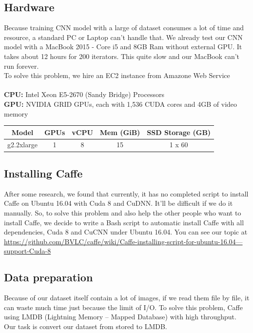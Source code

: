 \subsection{Hardware}
Because training CNN model with a large of dataset consumes a lot of time and resource, a standard PC or Laptop can't handle that. We already test our CNN model with a MacBook 2015 - Core i5 and 8GB Ram without external GPU. It takes about 12 hours for 200 iterators. This quite slow and our MacBook can't run forever.\\
To solve this problem, we hire an EC2 instance from Amazone Web Service\\
\\
\textbf{CPU:} Intel Xeon E5-2670 (Sandy Bridge) Processors\\
\textbf{GPU:} NVIDIA GRID GPUs, each with 1,536 CUDA cores and 4GB of video memory
\begin{center}
\begin{tabular}{| c | c | c | c | c |}
\hline
 Model & GPUs & vCPU & Mem (GiB) & SSD Storage (GB) \\ 
\hline
 g2.2xlarge & 1 & 8 & 15 & 1 x 60  \\
\hline
\end{tabular}
\end{center}

\subsection{Installing Caffe}
After some research, we found that currently, it has no completed script to install Caffe on Ubuntu 16.04 with Cuda 8 and CuDNN. It'll be difficult if we do it manually. So, to solve this problem and also help the other people who want to install Caffe, we decide to write a Bash script to automatic install Caffe with all dependencies, Cuda 8 and CuCNN under Ubuntu 16.04. You can see our topic at \href{https://github.com/BVLC/caffe/wiki/Caffe-installing-script-for-ubuntu-16.04---support-Cuda-8}{https://github.com/BVLC/caffe/wiki/Caffe-installing-script-for-ubuntu-16.04---support-Cuda-8}

\subsection{Data preparation}
Because of our dataset itself contain a lot of images, if we read them file by file, it can waste much time just because the limit of I/O. To solve this problem, Caffe using LMDB (Lightning Memory – Mapped Database) with high throughput. Our task is convert our dataset from stored to LMDB.\\

